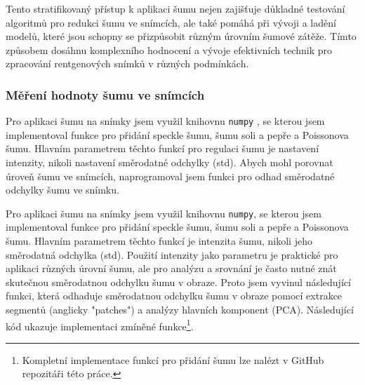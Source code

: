 \documentclass[male,czech,api_ing]{thesis}
\begin{document}
Tento stratifikovaný přístup k aplikaci šumu nejen zajišťuje důkladné testování algoritmů pro redukci šumu ve snímcích, ale také pomáhá při vývoji a ladění modelů, které jsou schopny se přizpůsobit různým úrovním šumové zátěže. Tímto způsobem dosáhnu komplexního hodnocení a vývoje efektivních technik pro zpracování rentgenových snímků v různých podmínkách.

\subsubsection{Měření hodnoty šumu ve snímcích}
Pro aplikaci šumu na snímky jsem využil knihovnu \texttt{numpy} \cite{Numpy}, se kterou jsem implementoval funkce pro přidání speckle šumu, šumu soli a pepře a Poissonova šumu. Hlavním parametrem těchto funkcí pro regulaci šumu je nastavení intenzity, nikoli nastavení směrodatné odchylky (std). Abych mohl porovnat úroveň šumu ve snímcích, naprogramoval jsem funkci pro odhad směrodatné odchylky šumu ve snímku.

Pro aplikaci šumu na snímky jsem využil knihovnu \texttt{numpy}, se kterou jsem implementoval funkce pro přidání speckle šumu, šumu soli a pepře a Poissonova šumu. Hlavním parametrem těchto funkcí je intenzita šumu, nikoli jeho směrodatná odchylka (std). Použití intenzity jako parametru je praktické pro aplikaci různých úrovní šumu, ale pro analýzu a srovnání je často nutné znát skutečnou směrodatnou odchylku šumu v obraze. Proto jsem vyvinul následující funkci, která odhaduje směrodatnou odchylku šumu v obraze pomocí extrakce segmentů (anglicky "patches") a analýzy hlavních komponent (PCA). Následující kód ukazuje implementaci zmíněné funkce\footnote{Kompletní implementace funkcí pro přidání šumu lze nalézt v GitHub repozitáři této práce.}.
\end{document}

